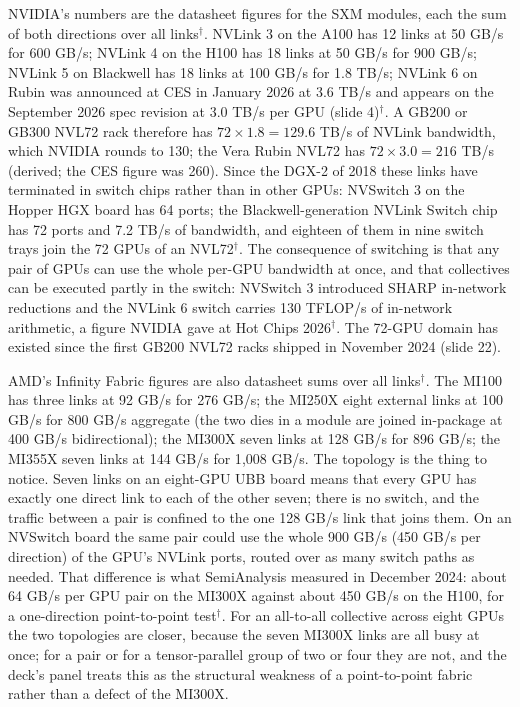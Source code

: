 \documentclass[11pt,letterpaper]{article}
\begin{document}
NVIDIA's numbers are the datasheet figures for the SXM modules, each the sum of both directions over all links$^\dagger$. NVLink 3 on the A100 has 12 links at 50 GB/s for 600 GB/s; NVLink 4 on the H100 has 18 links at 50 GB/s for 900 GB/s; NVLink 5 on Blackwell has 18 links at 100 GB/s for 1.8 TB/s; NVLink 6 on Rubin was announced at CES in January 2026 at 3.6 TB/s and appears on the September 2026 spec revision at 3.0 TB/s per GPU (slide 4)$^\dagger$. A GB200 or GB300 NVL72 rack therefore has $72 \times 1.8 = 129.6$ TB/s of NVLink bandwidth, which NVIDIA rounds to 130; the Vera Rubin NVL72 has $72 \times 3.0 = 216$ TB/s (derived; the CES figure was 260). Since the DGX-2 of 2018 these links have terminated in switch chips rather than in other GPUs: NVSwitch 3 on the Hopper HGX board has 64 ports; the Blackwell-generation NVLink Switch chip has 72 ports and 7.2 TB/s of bandwidth, and eighteen of them in nine switch trays join the 72 GPUs of an NVL72$^\dagger$. The consequence of switching is that any pair of GPUs can use the whole per-GPU bandwidth at once, and that collectives can be executed partly in the switch: NVSwitch 3 introduced SHARP in-network reductions and the NVLink 6 switch carries 130 TFLOP/s of in-network arithmetic, a figure NVIDIA gave at Hot Chips 2026$^\dagger$. The 72-GPU domain has existed since the first GB200 NVL72 racks shipped in November 2024 (slide 22).

AMD's Infinity Fabric figures are also datasheet sums over all links$^\dagger$. The MI100 has three links at 92 GB/s for 276 GB/s; the MI250X eight external links at 100 GB/s for 800 GB/s aggregate (the two dies in a module are joined in-package at 400 GB/s bidirectional); the MI300X seven links at 128 GB/s for 896 GB/s; the MI355X seven links at 144 GB/s for 1{,}008 GB/s. The topology is the thing to notice. Seven links on an eight-GPU UBB board means that every GPU has exactly one direct link to each of the other seven; there is no switch, and the traffic between a pair is confined to the one 128 GB/s link that joins them. On an NVSwitch board the same pair could use the whole 900 GB/s (450 GB/s per direction) of the GPU's NVLink ports, routed over as many switch paths as needed. That difference is what SemiAnalysis measured in December 2024: about 64 GB/s per GPU pair on the MI300X against about 450 GB/s on the H100, for a one-direction point-to-point test$^\dagger$. For an all-to-all collective across eight GPUs the two topologies are closer, because the seven MI300X links are all busy at once; for a pair or for a tensor-parallel group of two or four they are not, and the deck's panel treats this as the structural weakness of a point-to-point fabric rather than a defect of the MI300X.
\end{document}
